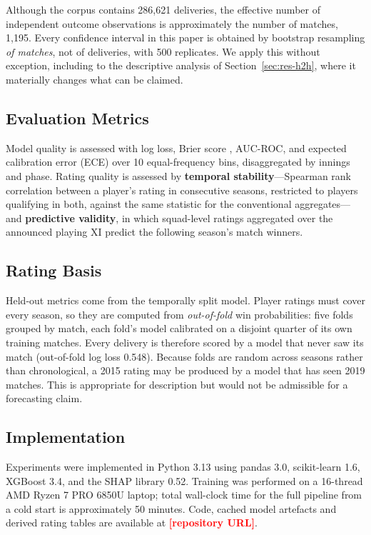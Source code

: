 \documentclass[conference]{IEEEtran}
\newcommand{\ph}[1]{\textcolor{red}{\textbf{[#1]}}}
\begin{document}
Although the corpus contains 286{,}621 deliveries, the effective number
of independent outcome observations is approximately the number of
matches, 1{,}195. Every confidence interval in this paper is obtained by
bootstrap resampling \emph{of matches}, not of deliveries, with 500
replicates. We apply this without exception, including to the
descriptive analysis of Section~\ref{sec:res-h2h}, where it materially
changes what can be claimed.

\subsection{Evaluation Metrics}

Model quality is assessed with log loss, Brier score \cite{brier1950},
AUC-ROC, and expected calibration error (ECE) over 10 equal-frequency
bins, disaggregated by innings and phase. Rating quality is assessed by
\textbf{temporal stability}---Spearman rank correlation between a
player's rating in consecutive seasons, restricted to players qualifying
in both, against the same statistic for the conventional
aggregates---and \textbf{predictive validity}, in which squad-level
ratings aggregated over the announced playing XI predict the following
season's match winners.

\subsection{Rating Basis}

Held-out metrics come from the temporally split model. Player ratings
must cover every season, so they are computed from \emph{out-of-fold}
win probabilities: five folds grouped by match, each fold's model
calibrated on a disjoint quarter of its own training matches. Every
delivery is therefore scored by a model that never saw its match
(out-of-fold log loss 0.548). Because folds are random across seasons
rather than chronological, a 2015 rating may be produced by a model that
has seen 2019 matches. This is appropriate for description but would not
be admissible for a forecasting claim.

\subsection{Implementation}

Experiments were implemented in Python 3.13 using pandas 3.0,
scikit-learn 1.6, XGBoost 3.4, and the SHAP library 0.52. Training was
performed on a 16-thread AMD Ryzen 7 PRO 6850U laptop; total wall-clock
time for the full pipeline from a cold start is approximately 50
minutes. Code, cached model artefacts and derived rating tables are
available at \ph{repository URL}.
\end{document}
